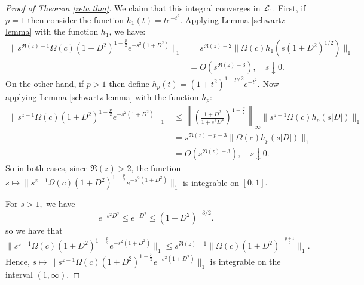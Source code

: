\begin{proof}[Proof of Theorem \ref{zeta thm}]
        We claim that this integral converges in $\mathcal{L}_1$. First, if $p=1$ then consider the function $h_1(t) = te^{-t^2}$. Applying Lemma \ref{schwartz lemma} with the function $h_1$,
        we have:
        \begin{align*}
            \|s^{\Re(z)-1}\Omega(c)(1+D^2)^{1-\frac{p}{2}}e^{-s^2(1+D^2)}\|_1 &= s^{\Re(z)-2}\|\Omega(c)h_1(s(1+D^2)^{1/2})\|_1\\
                                                                              &= O(s^{\Re(z)-3}),\quad s\downarrow 0.
        \end{align*}
        On the other hand, if $p > 1$ then define $h_p(t) = (1+t^2)^{1-p/2}e^{-t^2}.$ Now applying Lemma \ref{schwartz lemma} with the function $h_p$:
        \begin{align*}
            \|s^{z-1}\Omega(c)(1+D^2)^{1-\frac{p}{2}}e^{-s^2(1+D^2)}\|_1 &\leq \left\|\left(\frac{1+D^2}{1+s^2D^2}\right)^{1-\frac{p}{2}}\right\|_{\infty}\|s^{z-1}\Omega(c)h_p(s|D|)\|_1\\
                                                                         &= s^{\Re(z)+p-3}\|\Omega(c)h_p(s|D|)\|_1\\
                                                                         &= O(s^{\Re(z)-3}),\quad s\downarrow 0.
        \end{align*}
        So in both cases, since $\Re(z) > 2$, the function $s\mapsto \|s^{z-1}\Omega(c)(1+D^2)^{1-\frac{p}{2}}e^{-s^2(1+D^2)}\|_1$ is integrable on $[0,1].$
        
        For $s>1,$ we have
        \begin{equation*}
            e^{-s^2D^2}\leq e^{-D^2}\leq(1+D^2)^{-3/2}.
        \end{equation*}
        so we have that
        \begin{equation*}
            \|s^{z-1}\Omega(c)(1+D^2)^{1-\frac{p}{2}}e^{-s^2(1+D^2)}\|_{1} \leq s^{\Re(z)-1}\|\Omega(c)(1+D^2)^{-\frac{p+1}{2}}\|_1.
        \end{equation*}
        Hence, $s\mapsto \|s^{z-1}\Omega(c)(1+D^2)^{1-\frac{p}{2}}e^{-s^2(1+D^2)}\|_1$ is integrable on the interval $(1,\infty)$.


\end{proof}
